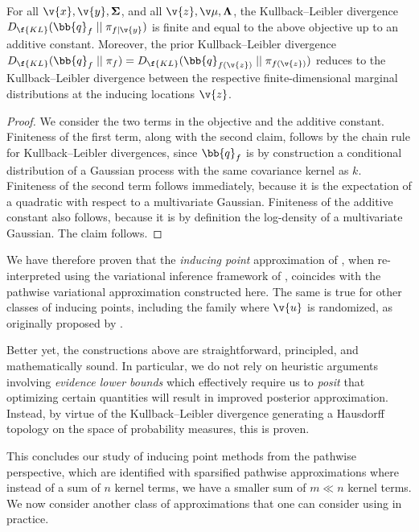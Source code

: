 \documentclass[11pt]{book}
\begin{document}
\begin{proposition}
For all $\v{x},\v{y},\m\Sigma$, and all $\v{z},\v\mu,\m\Lambda$, the Kullback--Leibler divergence $D_{\f{KL}}(\bb{q}_f \from \pi_{f \given\v{y}})$ is finite and equal to the above objective up to an additive constant.
Moreover, the prior Kullback--Leibler divergence $D_{\f{KL}}(\bb{q}_f \from \pi_f) = D_{\f{KL}}(\bb{q}_{f(\v{z})} \from \pi_{f(\v{z})})$ reduces to the Kullback--Leibler divergence between the respective finite-dimensional marginal distributions at the inducing locations $\v{z}$.
\end{proposition}

\begin{proof}
We consider the two terms in the objective and the additive constant.
\1 Finiteness of the first term, along with the second claim, follows by the chain rule for Kullback--Leibler divergences, since $\bb{q}_f$ is by construction a conditional distribution of a Gaussian process with the same covariance kernel as $k$.
\2 Finiteness of the second term follows immediately, because it is the expectation of a quadratic with respect to a multivariate Gaussian.
\3 Finiteness of the additive constant also follows, because it is by definition the log-density of a multivariate Gaussian.
\0 
The claim follows. 
\end{proof}

We have therefore proven that the \emph{inducing point} approximation of \textcite{opper09}, when re-interpreted using the variational inference framework of \textcite{titsias09}, coincides with the pathwise variational approximation constructed here.
The same is true for other classes of inducing points, including the family where $\v{u}$ is randomized, as originally proposed by \textcite{titsias09}.

Better yet, the constructions above are straightforward, principled, and mathematically sound.
In particular, we do not rely on heuristic arguments involving \emph{evidence lower bounds} which effectively require us to \emph{posit} that optimizing certain quantities will result in improved posterior approximation.
Instead, by virtue of the Kullback--Leibler divergence generating a Hausdorff topology on the space of probability measures, this is proven.

This concludes our study of inducing point methods from the pathwise perspective, which are identified with sparsified pathwise approximations where instead of a sum of $n$ kernel terms, we have a smaller sum of $m \ll n$ kernel terms.
We now consider another class of approximations that one can consider using in practice.
\end{document}
